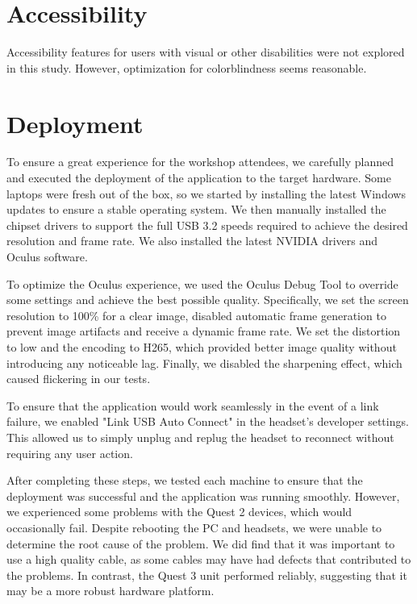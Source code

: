 \documentclass[draft, final]{vutinfth} %
\begin{document}
\section{Accessibility}

Accessibility features for users with visual or other disabilities were not explored in this study. However, optimization for colorblindness seems reasonable.

\section{Deployment}

To ensure a great experience for the workshop attendees, we carefully planned and executed the deployment of the application to the target hardware. Some laptops were fresh out of the box, so we started by installing the latest Windows updates to ensure a stable operating system. We then manually installed the chipset drivers to support the full USB 3.2 speeds required to achieve the desired resolution and frame rate. We also installed the latest NVIDIA drivers and Oculus software.

To optimize the Oculus experience, we used the Oculus Debug Tool to override some settings and achieve the best possible quality. Specifically, we set the screen resolution to 100\% for a clear image, disabled automatic frame generation to prevent image artifacts and receive a dynamic frame rate. We set the distortion to low and the encoding to H265, which provided better image quality without introducing any noticeable lag. Finally, we disabled the sharpening effect, which caused flickering in our tests.

To ensure that the application would work seamlessly in the event of a link failure, we enabled "Link USB Auto Connect" in the headset's developer settings. This allowed us to simply unplug and replug the headset to reconnect without requiring any user action.

After completing these steps, we tested each machine to ensure that the deployment was successful and the application was running smoothly. However, we experienced some problems with the Quest 2 devices, which would occasionally fail. Despite rebooting the PC and headsets, we were unable to determine the root cause of the problem. We did find that it was important to use a high quality cable, as some cables may have had defects that contributed to the problems. In contrast, the Quest 3 unit performed reliably, suggesting that it may be a more robust hardware platform.
\end{document}
